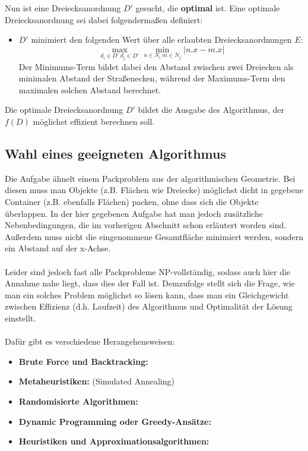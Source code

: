 \documentclass[a4paper, notitlepage, 12pt]{scrartcl}
\begin{document}
Nun ist eine Dreiecksanordnung $D'$ gesucht, die \textbf{optimal} ist. Eine optimale Dreiecksanordnung sei dabei folgendermaßen definiert:
\begin{itemize}
	\item $D'$ minimiert den folgenden Wert über alle erlaubten Dreiecksanordnungen $E$:
	\begin{equation}
	\max_{d_i \in D' ~ d_j \in D'} \min_{n \in N_i ~ m \in N_j} | n.x - m.x |
	\end{equation}
	Der Minimums-Term bildet dabei den Abstand zwischen zwei Dreiecken als minimalen Abstand der Straßenecken, während der Maximums-Term den maximalen solchen Abstand berechnet.
\end{itemize}
 Die optimale Dreiecksanordnung $D'$ bildet die Ausgabe des Algorithmus, der $f(D)$ möglichst effizient berechnen soll.
 \subsection{Wahl eines geeigneten Algorithmus}
 Die Aufgabe ähnelt einem Packproblem aus der algorithmischen Geometrie. Bei diesen muss man Objekte (z.B. Flächen wie Dreiecke) möglichst dicht in gegebene Container (z.B. ebenfalls Flächen) packen, ohne dass sich die Objekte überlappen.\cite{Src:pack} In der hier gegebenen Aufgabe hat man jedoch zusätzliche Nebenbedingungen, die im vorherigen Abschnitt schon erläutert worden sind. Außerdem muss nicht die eingenommene Gesamtfläche minimiert werden, sondern ein Abstand auf der x-Achse. \\ \\
 Leider sind jedoch fast alle Packprobleme NP-vollständig, sodass auch hier die Annahme nahe liegt, dass dies der Fall ist. Demzufolge stellt sich die Frage, wie man ein solches Problem möglichst so lösen kann, dass man ein Gleichgewicht zwischen Effizienz (d.h. Laufzeit) des Algorithmus und Optimalität der Lösung einstellt. \\ \\
 Dafür gibt es verschiedene Herangehensweisen:
 \begin{itemize}
 	\item \textbf{Brute Force und Backtracking:}
 	\item \textbf{Metaheuristiken:} (Simulated Annealing)
 	\item \textbf{Randomisierte Algorithmen:}
 	\item \textbf{Dynamic Programming oder Greedy-Ansätze:}
 	\item \textbf{Heuristiken und Approximationsalgorithmen:}
 \end{itemize}
\end{document}
